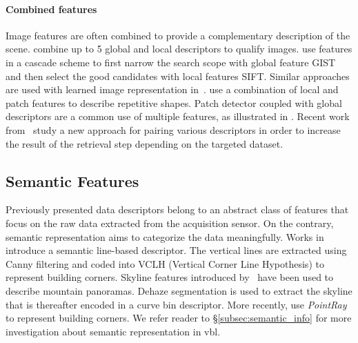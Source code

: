		\paragraph{Combined features}
			Image features are often combined to provide a complementary description of the scene. \citet{Hays2008} combine up to 5 global and local descriptors to qualify images. \citet{Azzi2016} use features in a cascade scheme to first narrow the search scope with global feature GIST and then select the good candidates with local features SIFT. Similar approaches are used with learned image representation in~\citep{Sarlin2018a,Sarlin2018,Rocco2018,Sattler2017,Piasco2019a,Taira2018,Dusmanu2019}. \citet{Morago2016} use a combination of local and patch features to describe repetitive shapes. Patch detector coupled with global descriptors are a common use of multiple features, as illustrated in \citep{Kim2015,Gordo2016,Sunderhauf2015a,Yan2016}. Recent work from~\citet{Bhowmik2017} study a new approach for pairing various descriptors in order to increase the result of the retrieval step depending on the targeted dataset.
						
	\subsection{Semantic Features}		
	\label{subsec:semantic_representation}
		Previously presented data descriptors belong to an abstract class of features that focus on the raw data extracted from the acquisition sensor. On the contrary, semantic representation aims to categorize the data meaningfully. Works in~\citep{Cham2010} introduce a semantic line-based descriptor. The vertical lines are extracted using Canny filtering and coded into VCLH (Vertical Corner Line Hypothesis) to represent building corners. Skyline features introduced by~\citet{Baatz2012} have been used to describe mountain panoramas. Dehaze segmentation is used to extract the skyline that is thereafter encoded in a curve bin descriptor. More recently, \citet{Bansal2014} use \textit{PointRay} to represent building corners. We refer reader to \S\ref{subsec:semantic_info} for more investigation about semantic representation in \ac{vbl}.
		
		